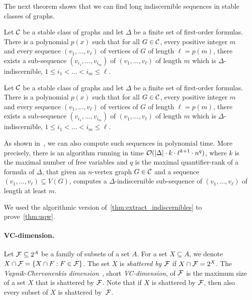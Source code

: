 The next theorem shows that we can find long indiscernible
sequences in stable classes of graphs. 

\begin{theorem}\label{thm:malshelah}
  Let $\mathcal{C}$ be a stable class of graphs and let $\Delta$ be a finite
  set of first-order formulas.  There is a polynomial $p(x)$ such that
  for all $G\in \mathcal{C}$, every positive integer $m$ and every sequence
  $(v_1,\ldots, v_\ell)$ of vertices of $G$ of length $\ell=p(m)$, there
  exists a sub-sequence $(v_{i_1},\ldots, v_{i_m})$ of
  $(v_1,\ldots, v_\ell)$ of length $m$ which is
  $\Delta$-indiscernible, $1\leq i_1<\ldots <i_m\leq \ell$.
\end{theorem}


\begin{theorem}\label{thm:extract_indiscernibles}
  Let $\mathcal{C}$ be a stable class of graphs and let $\Delta$ be a finite
  set of first-order formulas.  There is a polynomial $p(x)$ such that
  for all $G\in \mathcal{C}$, every positive integer $m$ and every sequence
  $(v_1,\ldots, v_\ell)$ of vertices of $G$ of length $\ell=p(m)$, there
  exists a sub-sequence $(v_{i_1},\ldots, v_{i_m})$ of
  $(v_1,\ldots, v_\ell)$ of length $m$ which is
  $\Delta$-indiscernible, $1\leq i_1<\ldots <i_m\leq \ell$.
\end{theorem}

As shown in~\cite{siebertz2016polynomial}, we can also compute
such sequences in polynomial time. More precisely, there is an algorithm running in time
  $\mathcal{O}(\left\lvert\Delta\right\rvert\cdot k \cdot \ell^{k+1}
    \cdot n^{q})$, where $k$ is the maximal number of 
    free variables and $q$ is 
    the maximal quantifier-rank of a formula of $\Delta$, 
    that given an $n$-vertex graph $G\in \mathcal{C}$ and a sequence
  $(v_1,\ldots, v_\ell)\subseteq V(G)$, computes a
  $\Delta$-indiscernible sub-sequence of $(v_1,\ldots, v_\ell)$ 
  of length at least $m$.

We used the algorithmic version of~\cref{thm:extract_indiscernibles} 
to prove~\cref{thm:uqw}.

\paragraph{VC-dimension.}

Let $\mathcal{F}\subseteq 2^A$ be a family of
subsets of a set $A$. For a set $X\subseteq A$, we denote $X\cap \mathcal{F}=\{X\cap F : F\in \mathcal{F}\}$.
The set $X$ is \emph{shattered by $\mathcal{F}$} if $X\cap \mathcal{F}=2^X$.
The \emph{Vapnik-Chervonenkis dimension}~\cite{chervonenkis1971theory}, 
short \emph{VC-dimension},
of $\mathcal{F}$ is the maximum size of a set $X$ that is shattered by
$\mathcal{F}$. Note that if $X$ is shattered by $\mathcal{F}$, then also every
subset of $X$ is shattered by~$\mathcal{F}$.

